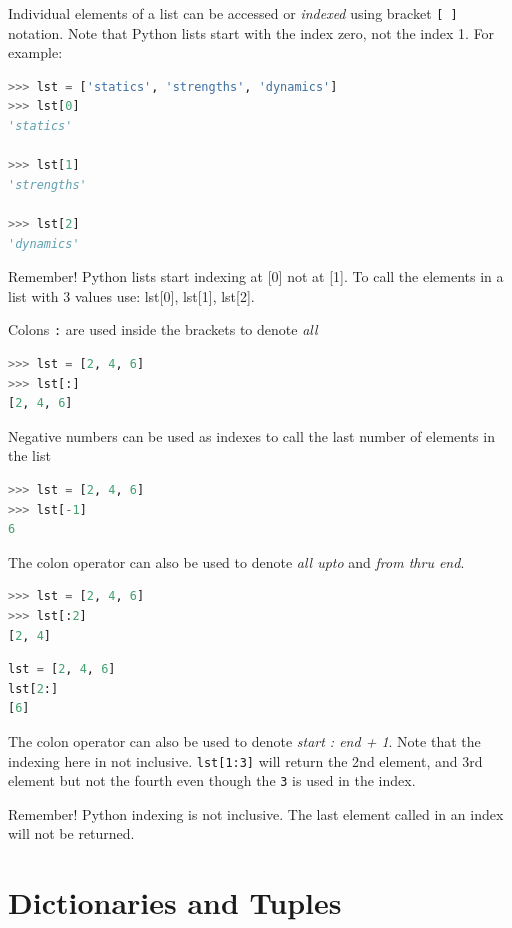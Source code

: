 \documentclass{book}
\begin{document}
Individual elements of a list can be accessed or \emph{indexed} using
bracket \lstinline![ ]! notation. Note that Python lists start with the
index zero, not the index 1. For example:

\begin{lstlisting}[language=Python]
>>> lst = ['statics', 'strengths', 'dynamics']
>>> lst[0]
'statics'

>>> lst[1]
'strengths'

>>> lst[2]
'dynamics'
\end{lstlisting}

Remember! Python lists start indexing at {[}0{]} not at {[}1{]}. To call
the elements in a list with 3 values use: lst{[}0{]}, lst{[}1{]},
lst{[}2{]}.

Colons \lstinline!:! are used inside the brackets to denote \emph{all}

\begin{lstlisting}[language=Python]
>>> lst = [2, 4, 6]
>>> lst[:]
[2, 4, 6]
\end{lstlisting}

Negative numbers can be used as indexes to call the last number of
elements in the list

\begin{lstlisting}[language=Python]
>>> lst = [2, 4, 6]
>>> lst[-1]
6
\end{lstlisting}

The colon operator can also be used to denote \emph{all upto} and
\emph{from thru end}.

\begin{lstlisting}[language=Python]
>>> lst = [2, 4, 6]
>>> lst[:2]
[2, 4]
\end{lstlisting}

\begin{lstlisting}[language=Python]
lst = [2, 4, 6]
lst[2:]
[6]
\end{lstlisting}

The colon operator can also be used to denote \emph{start : end + 1}.
Note that the indexing here in not inclusive. \lstinline!lst[1:3]! will
return the 2nd element, and 3rd element but not the fourth even though
the \lstinline!3! is used in the index.

Remember! Python indexing is not inclusive. The last element called in
an index will not be returned.

    \section{Dictionaries and Tuples}\label{dictionaries-and-tuples}
\end{document}
